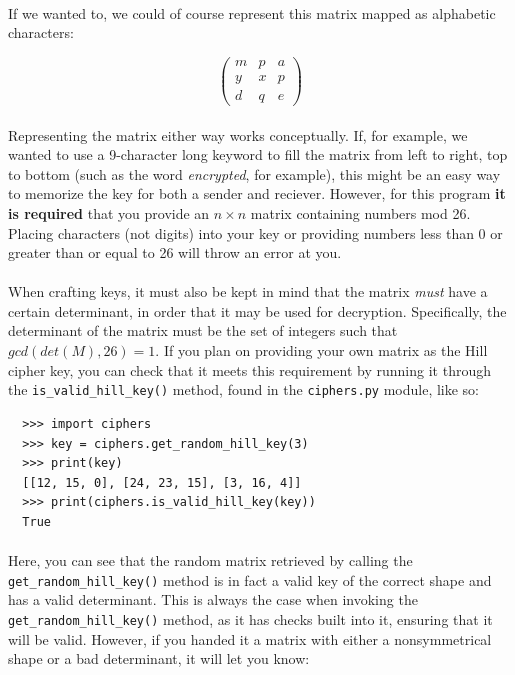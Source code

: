 \documentclass[12pt,a4paper]{article}
\begin{document}
\paragraph{}
If we wanted to, we could of course represent this matrix mapped as alphabetic 
characters:

$$
\begin{pmatrix}
  m & p & a \\
  y & x & p \\
  d & q & e
\end{pmatrix}
$$

\paragraph{}
Representing the matrix either way works conceptually.  If, for example, we 
wanted to use a 9-character long keyword to fill the matrix from left to right, 
top to bottom (such as the word \textit{encrypted}, for example), this might be 
an easy way to memorize the key for both a sender and reciever.  However, 
for this program \textbf{it is required} that you provide an $n \times n$ 
matrix containing numbers mod 26.  Placing characters (not digits) into your 
key or providing numbers less than 0 or greater than or equal to 26 will throw 
an error at you.

\paragraph{}
When crafting keys, it must also be kept in mind that the matrix \textit{must} 
have a certain determinant, 
in order that it may be used for decryption.  Specifically, the determinant of 
the matrix must be the set of integers such that $gcd(det(M),26) = 1$.  If you 
plan on providing your own matrix as the Hill cipher key, you can check that it 
meets this requirement by running it through the \verb|is_valid_hill_key()| 
method, found in the \verb|ciphers.py| module, like so:

\begin{verbatim}
  >>> import ciphers
  >>> key = ciphers.get_random_hill_key(3)
  >>> print(key)
  [[12, 15, 0], [24, 23, 15], [3, 16, 4]]
  >>> print(ciphers.is_valid_hill_key(key))
  True
\end{verbatim}

\paragraph{}
Here, you can see that the random matrix retrieved by calling the 
\verb|get_random_hill_key()| method is in fact a valid key of the correct 
shape and has a valid determinant.  This is always the case 
when invoking the \verb|get_random_hill_key()| method, as it has checks built into it, 
ensuring that it will be valid.  However, if you handed it a matrix with either 
a nonsymmetrical shape or a bad determinant, it will let you know:
\end{document}
